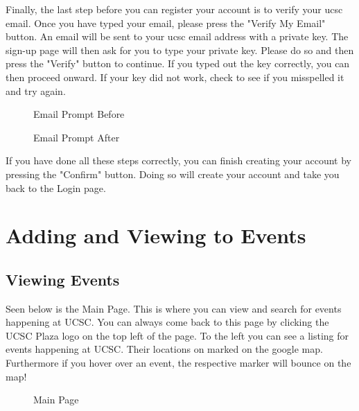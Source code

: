 \documentclass[10pt]{article}
\newcommand{\fancysec}[2] {{\color{primary}\section{#1} \label{sec:#2}}}
\newcommand{\fancysub}[2] {{\color{primary}\subsection{#1} \label{sec:#2}}}
\begin{document}
			Finally, the last step before you can register your account is to verify your ucsc email. Once you have typed your email, please press the "Verify My Email" button. An email will be sent to your ucsc email address with a private key. The sign-up page will then ask for you to type your private key. Please do so and then press the "Verify" button to continue. If you typed out the key correctly, you can then proceed onward. If your key did not work, check to see if you misspelled it and try again.
				
			\begin{figure}[H]
				\centering
				\caption{Email Prompt Before}
				\label{fig:awesome_image}
			\end{figure}
			
			\begin{figure}[H]
				\centering
				\caption{Email Prompt After}
				\label{fig:awesome_image}
			\end{figure}
			
			If you have done all these steps correctly, you can finish creating your account by pressing the "Confirm" button. Doing so will create your account and take you back to the Login page.
	
	\clearpage		
	\fancysec{Adding and Viewing to Events}{viewrespondevents}
		\fancysub{Viewing Events}{viewevent}
			Seen below is the Main Page. This is where you can view and search for events happening at UCSC. You can always come back to this page by clicking the UCSC Plaza logo on the top left of the page. To the left you can see a listing for events happening at UCSC. Their locations on marked on the google map. Furthermore if you hover over an event, the respective marker will bounce on the map!
			
			\begin{figure}[H]
				\centering
				\caption{Main Page}
				\label{fig:awesome_image}
			\end{figure}
			
\end{document}
